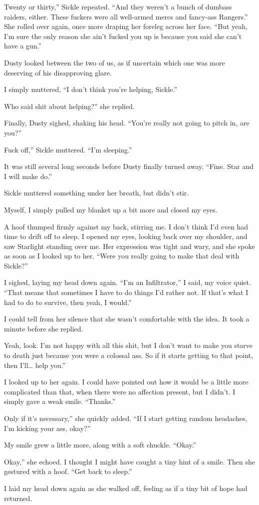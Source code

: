 \leavevmode{}Twenty or thirty,” Sickle repeated. “And they weren’t a bunch of dumbass raiders, either. These fuckers were all well-armed mercs and fancy-ass Rangers.” She rolled over again, once more draping her foreleg across her face. “But yeah, I’m sure the only reason she ain’t fucked you up is because you said she can’t have a gun.”

Dusty looked between the two of us, as if uncertain which one was more deserving of his disapproving glare.

I simply muttered, “I don’t think you’re helping, Sickle.”

\leavevmode{}Who said shit about helping?” she replied.

Finally, Dusty sighed, shaking his head. “You’re really not going to pitch in, are you?”

\leavevmode{}Fuck off,” Sickle muttered. “I’m sleeping.”

It was still several long seconds before Dusty finally turned away. “Fine. Star and I will make do.”

Sickle muttered something under her breath, but didn’t stir.

Myself, I simply pulled my blanket up a bit more and closed my eyes.

{\br}%
A hoof thumped firmly against my back, stirring me. I don’t think I’d even had time to drift off to sleep. I opened my eyes, looking back over my shoulder, and saw Starlight standing over me. Her expression was tight and wary, and she spoke as soon as I looked up to her. “Were you really going to make that deal with Sickle?”

I sighed, laying my head down again. “I’m an Infiltrator,” I said, my voice quiet. “That means that sometimes I have to do things I’d rather not. If that’s what I had to do to survive, then yeah, I would.”

I could tell from her silence that she wasn’t comfortable with the idea. It took a minute before she replied.

\leavevmode{}Yeah, look. I’m not happy with all this shit, but I don’t want to make you starve to death just because you were a colossal ass. So if it starts getting to that point, then I’ll… help you.”

I looked up to her again. I could have pointed out how it would be a little more complicated than that, when there were no affection present, but I didn’t. I simply gave a weak smile. “Thanks.”

\leavevmode{}Only if it’s necessary,” she quickly added. “If I start getting random headaches, I’m kicking your ass, okay?”

My smile grew a little more, along with a soft chuckle. “Okay.”

\leavevmode{}Okay,” she echoed. I thought I might have caught a tiny hint of a smile. Then she gestured with a hoof. “Get back to sleep.”

I laid my head down again as she walked off, feeling as if a tiny bit of hope had returned.